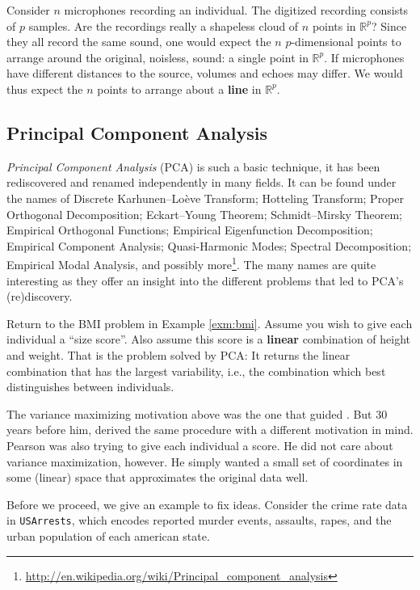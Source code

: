 \documentclass[]{book}
\theoremstyle{definition}
\theoremstyle{definition}
\theoremstyle{definition}
\theoremstyle{remark}
\let\BeginKnitrBlock\begin \let\EndKnitrBlock\end
\begin{document}
\BeginKnitrBlock{example}
\protect\hypertarget{exm:blind-signal}{}{\label{exm:blind-signal} }Consider \(n\) microphones recording an individual.
The digitized recording consists of \(p\) samples.
Are the recordings really a shapeless cloud of \(n\) points in \(\mathbb{R}^p\)?
Since they all record the same sound, one would expect the \(n\) \(p\)-dimensional points to arrange around the original, noisless, sound: a single point in \(\mathbb{R}^p\).
If microphones have different distances to the source, volumes and echoes may differ.
We would thus expect the \(n\) points to arrange about a \textbf{line} in \(\mathbb{R}^p\).
\EndKnitrBlock{example}

\hypertarget{pca}{%
\subsection{Principal Component Analysis}\label{pca}}

\emph{Principal Component Analysis} (PCA) is such a basic technique, it has been rediscovered and renamed independently in many fields.
It can be found under the names of
Discrete Karhunen--Loève Transform; Hotteling Transform; Proper Orthogonal Decomposition; Eckart--Young Theorem; Schmidt--Mirsky Theorem; Empirical Orthogonal Functions; Empirical Eigenfunction Decomposition; Empirical Component Analysis; Quasi-Harmonic Modes; Spectral Decomposition; Empirical Modal Analysis, and possibly more\footnote{\url{http://en.wikipedia.org/wiki/Principal_component_analysis}}.
The many names are quite interesting as they offer an insight into the different problems that led to PCA's (re)discovery.

Return to the BMI problem in Example \ref{exm:bmi}.
Assume you wish to give each individual a ``size score''.
Also assume this score is a \textbf{linear} combination of height and weight.
That is the problem solved by PCA:
It returns the linear combination that has the largest variability, i.e., the combination which best distinguishes between individuals.

The variance maximizing motivation above was the one that guided \citet{hotelling1933analysis}.
But \(30\) years before him, \citet{pearson1901liii} derived the same procedure with a different motivation in mind.
Pearson was also trying to give each individual a score.
He did not care about variance maximization, however.
He simply wanted a small set of coordinates in some (linear) space that approximates the original data well.

Before we proceed, we give an example to fix ideas.
Consider the crime rate data in \texttt{USArrests}, which encodes reported murder events, assaults, rapes, and the urban population of each american state.
\end{document}
